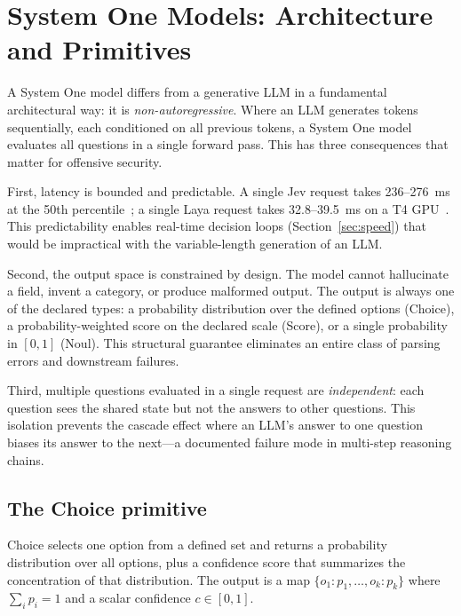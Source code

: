 \documentclass[conference]{IEEEtran}
\begin{document}
\section{System One Models: Architecture and Primitives}\label{sec:sysone_arch}

A System One model differs from a generative LLM in a fundamental architectural way: it is \emph{non-autoregressive}. Where an LLM generates tokens sequentially, each conditioned on all previous tokens, a System One model evaluates all questions in a single forward pass. This has three consequences that matter for offensive security.

First, latency is bounded and predictable. A single Jev request takes 236--276~ms at the 50th percentile~\cite{typesafe2026docs}; a single Laya request takes 32.8--39.5~ms on a T4 GPU~\cite{laya2026}. This predictability enables real-time decision loops (Section~\ref{sec:speed}) that would be impractical with the variable-length generation of an LLM.

Second, the output space is constrained by design. The model cannot hallucinate a field, invent a category, or produce malformed output. The output is always one of the declared types: a probability distribution over the defined options (Choice), a probability-weighted score on the declared scale (Score), or a single probability in $[0,1]$ (Noul). This structural guarantee eliminates an entire class of parsing errors and downstream failures.

Third, multiple questions evaluated in a single request are \emph{independent}: each question sees the shared state but not the answers to other questions. This isolation prevents the cascade effect where an LLM's answer to one question biases its answer to the next---a documented failure mode in multi-step reasoning chains.

\subsection{The Choice primitive}

Choice selects one option from a defined set and returns a probability distribution over all options, plus a confidence score that summarizes the concentration of that distribution. The output is a map $\{o_1: p_1, \ldots, o_k: p_k\}$ where $\sum_i p_i = 1$ and a scalar confidence $c \in [0,1]$.
\end{document}
